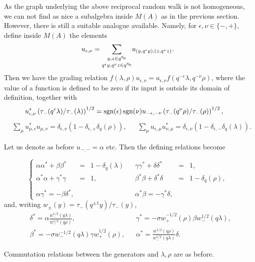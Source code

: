As the graph underlying the above reciprocal random walk is not homogeneous, we can not find as nice a subalgebra inside $M(A)$ as in the previous section. However, there is still a suitable analogue available. Namely, for $\epsilon,\nu \in \{-,+\}$, define inside $M(A)$ the elements \[u_{\epsilon,\nu} =\underset{q^{\epsilon}y,q^{\nu}z \in q^{\mathbb{N}_0}}{ \sum_{y,z\in q^{\mathbb{N}_0}}} u_{(y,q^{\epsilon}y),(z,q^{\nu}z)}.\] Then we have the grading relation  $f(\lambda,\rho) u_{\epsilon,\nu} = u_{\epsilon,\nu}f(q^{-\epsilon}\lambda,q^{-\nu}\rho)$, where the value of a function is defined to be zero if its input is outside its domain of definition, together with \begin{align*}
& u_{\epsilon,\nu}^* \left(\tau_-(q^{\epsilon}\lambda)/\tau_-(\lambda)\right)^{1/2} = \operatorname{\mathrm{sgn}}(\epsilon)\operatorname{\mathrm{sgn}}(\nu) u_{-\epsilon,-\nu}\left(\tau_-(q^{\nu}\rho)/\tau_-(\rho)\right)^{1/2},\end{align*} 
\begin{align*} 
&\sum_{\mu} u_{\mu,\epsilon}^* u_{\mu,\nu} = \delta_{\epsilon,\nu}(1- \delta_{\epsilon,+}\delta_{q}(\rho)), && \sum_{\mu} u_{\epsilon,\mu}u_{\nu,\mu}^* = \delta_{\epsilon,\nu}(1-\delta_{\epsilon,-}\delta_{q}(\lambda)).\end{align*}

Let us denote as before $u_{-,-}=\alpha$ etc. Then the defining relations become 

\begin{equation*} \left\{\begin{array}{llllllll} \alpha \alpha^* +\beta\beta^* &=& 1-\delta_q(\lambda) && \gamma \gamma^* + \delta\delta^* &=& 1,\\
\alpha^*\alpha + \gamma^* \gamma &=& 1, && \beta^* \beta +\delta^*\delta &=&1-\delta_q(\rho),\\ \\  \alpha \gamma^* = -\beta \delta^*, &&&& \alpha^* \beta = -\gamma^* \delta,\end{array}\right.\end{equation*} 
and, writing $w_{\pm}(y) = \tau_-(q^{\pm 1}y)/\tau_-(y)$, 
\begin{align*} &\delta^* = \alpha \frac{w_-^{1/2}(q\lambda)}{w_-^{1/2}(q\rho)}, &&\gamma^* = -\sigma w_+^{-1/2}(\rho)\beta w_-^{1/2}(q\lambda),\\ 
&\beta^* = -\sigma w_-^{-1/2}(q\lambda)\gamma w_+^{1/2}(\rho),&&\alpha^* =  \frac{w_-^{1/2}(q\rho)}{w_-^{1/2}(q\lambda)}\delta.\end{align*}

Commutation relations between the generators and $\lambda,\rho$ are as before.

